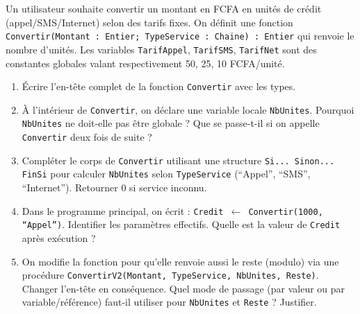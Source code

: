 \documentclass[11pt]{article}
\begin{document}
\begin{exercice}
Un utilisateur souhaite convertir un montant en FCFA en unités de crédit (appel/SMS/Internet) selon des tarifs fixes. On définit une fonction \texttt{Convertir(Montant : Entier; TypeService : Chaine) : Entier} qui renvoie le nombre d'unités. Les variables \texttt{TarifAppel}, \texttt{TarifSMS}, \texttt{TarifNet} sont des constantes globales valant respectivement 50, 25, 10 FCFA/unité.
\begin{enumerate}
    \item Écrire l'en-tête complet de la fonction \texttt{Convertir} avec les types.
    \item À l'intérieur de \texttt{Convertir}, on déclare une variable locale \texttt{NbUnites}. Pourquoi \texttt{NbUnites} ne doit-elle pas être globale ? Que se passe-t-il si on appelle \texttt{Convertir} deux fois de suite ?
    \item Compléter le corps de \texttt{Convertir} utilisant une structure \texttt{Si... Sinon... FinSi} pour calculer \texttt{NbUnites} selon \texttt{TypeService} (``Appel'', ``SMS'', ``Internet''). Retourner 0 si service inconnu.
    \item Dans le programme principal, on écrit : \texttt{Credit $\leftarrow$ Convertir(1000, ``Appel'')}. Identifier les paramètres effectifs. Quelle est la valeur de \texttt{Credit} après exécution ?
    \item On modifie la fonction pour qu'elle renvoie aussi le reste (modulo) via une procédure \texttt{ConvertirV2(Montant, TypeService, NbUnites, Reste)}. Changer l'en-tête en conséquence. Quel mode de passage (par valeur ou par variable/référence) faut-il utiliser pour \texttt{NbUnites} et \texttt{Reste} ? Justifier.
\end{enumerate}
\end{exercice}
\end{document}
